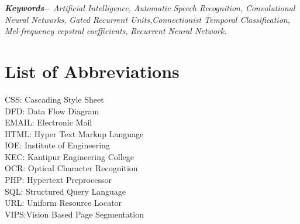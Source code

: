 \par
\textbf{\textit{Keywords$-$}}{\textit{ Artificial Intelligence,}}{\textit{ Automatic Speech Recognition,}} {\textit{  Convolutional Neural Networks,}}{\textit{  Gated Recurrent Units,}}{\textit{Connectionist Temporal Classification,}}{\textit{  Mel-frequency cepstral coefficients,}}{\textit{ Recurrent Neural Network.}}

\par

{
\KECadjusttocspacings %
\makeatletter
\def\@makeschapterhead#1{%
  {\newpage \parindent \z@ \raggedright
    \normalfont
    \interlinepenalty\@M
    \center \fontsize{16pt}{1} \bfseries \MakeUppercase{#1}\par\nobreak
    \vskip 18\p@ %
  }}
\makeatother 
\setcounter{secnumdepth}{5}

\tableofcontents %
\listoffigures %


\chapter*{List of Abbreviations}
	CSS:  Cascading Style Sheet\\
	DFD: Data Flow Diagram\\
	EMAIL: Electronic Mail\\
	HTML: Hyper Text Markup Language\\
	IOE: Institute of Engineering\\
	KEC: Kantipur Engineering College\\
	OCR: Optical Character Recognition \\
	PHP: Hypertext Preprocessor\\
	SQL: Structured Query Language\\
	URL: Uniform Resource Locator\\
	VIPS:Vision Based Page Segmentation

	
	
}

